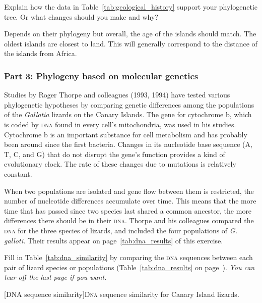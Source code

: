 \documentclass[12pt, hidelinks]{exam}
\newcommand*\AnswerBox[2]{%
    \parbox[t][#1]{0.92\textwidth}{%
    \begin{solution}#2\end{solution}}
    \vspace{\stretch{1}}
}
\begin{document}
\begin{questions}

\question
Explain how the data in Table~\ref{tab:geological_history} support your phylogenetic tree. Or what changes should you make and why?

\AnswerBox{2\baselineskip}{Depends on their phylogeny but overall, the age of the islands should match. 
The oldest islands are closest to land. This will generally correspond to the distance of the islands from Africa.}

\subsubsection*{Part 3: Phylogeny based on molecular genetics}

Studies by Roger Thorpe and colleagues (1993, 1994) have tested various phylogenetic hypotheses by comparing genetic differences among the populations of the \textit{Gallotia} lizards on the Canary Islands. The gene for cytochrome b, which is coded by \textsc{dna} found in every cell’s mitochondria, was used in his studies. Cytochrome b is an important substance for cell metabolism and has probably been around since the first bacteria. Changes in its nucleotide base sequence (\textsc{A, T, C,} and \textsc{G}) that do not disrupt the gene’s function provides a kind of evolutionary clock. The rate of these changes due to mutations is relatively constant. 

When two populations are isolated and gene flow between them is restricted, the number of nucleotide differences accumulate over time. This means that the more time that has passed since two species last shared a common ancestor, the more differences there should be in their \textsc{dna.}  Thorpe and his colleagues compared the \textsc{dna} for the three species of lizards, and included the four populations of \textit{G. galloti.} Their results appear on page~\ref{tab:dna_results} of this exercise. 

\question
Fill in Table~\ref{tab:dna_similarity} by comparing the \textsc{dna} sequences between each pair of lizard species or populations (Table~\ref{tab:dna_results} on page~\pageref{tab:dna_results}). \emph{You can tear off the last page if you want.}

\vspace{\baselineskip}

{[DNA sequence similarity]{D\textsc{na} sequence similarity for Canary Island lizards.\label{tab:dna_similarity}}
	}
\end{questions}
\end{document}
